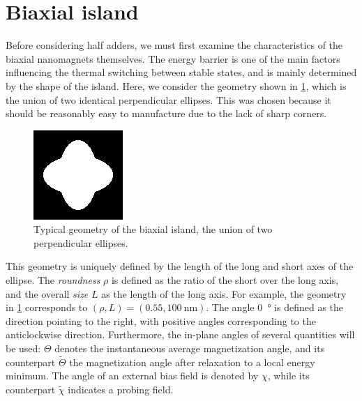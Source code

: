 \documentclass[twocolumn]{phdsymp}
\begin{document}
\section{Biaxial island}
Before considering half adders, we must first examine the characteristics of the biaxial nanomagnets themselves. The energy barrier is one of the main factors influencing the thermal switching between stable states, and is mainly determined by the shape of the island. Here, we consider the geometry shown in \cref{fig:EA_geom}, which is the union of two identical perpendicular ellipses. This was chosen because it should be reasonably easy to manufacture due to the lack of sharp corners. \par
\begin{figure}
    \centering
    \includegraphics[width=0.4\columnwidth]{Figures/geomPlus55.png}
    \caption{Typical geometry of the biaxial island, the union of two perpendicular ellipses.}
    \label{fig:EA_geom}
\end{figure}
This geometry is uniquely defined by the length of the long and short axes of the ellipse. The \textit{roundness} $\rho$ is defined as the ratio of the short over the long axis, and the overall \textit{size} $L$ as the length of the long axis. For example, the geometry in \cref{fig:EA_geom} corresponds to $(\rho,L) = (0.55, \SI{100}{\nano\metre})$. The angle \SI{0}{\degree} is defined as the direction pointing to the right, with positive angles corresponding to the anticlockwise direction. Furthermore, the in-plane angles of several quantities will be used: $\Theta$ denotes the instantaneous average magnetization angle, and its counterpart $\widetilde{\Theta}$ the magnetization angle after relaxation to a local energy minimum. The angle of an external bias field is denoted by $\chi$, while its counterpart $\widetilde{\chi}$ indicates a probing field. \par
\end{document}
